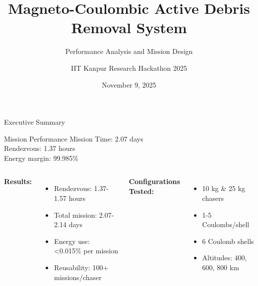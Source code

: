 \documentclass[aspectratio=169]{beamer}
\title{Magneto-Coulombic Active Debris Removal System}
\subtitle{Performance Analysis and Mission Design}
\author{IIT Kanpur Research Hackathon 2025}
\date{November 9, 2025}
\institute{Indian Institute of Technology Kanpur}
\begin{document}
\begin{frame}
\titlepage
\end{frame}

\begin{frame}{Executive Summary}
\begin{block}{Mission Performance}
\centering
\Large
Mission Time: 2.07 days\\
Rendezvous: 1.37 hours\\
Energy margin: 99.985\%
\end{block}

\vspace{0.5cm}

\begin{columns}[t]
\textbf{Results:}
\begin{itemize}
    \item Rendezvous: 1.37-1.57 hours
    \item Total mission: 2.07-2.14 days
    \item Energy use: <0.015\% per mission
    \item Reusability: 100+ missions/chaser
\end{itemize}

\textbf{Configurations Tested:}
\begin{itemize}
    \item 10 kg \& 25 kg chasers
    \item 1-5 Coulombs/shell
    \item 6 Coulomb shells
    \item Altitudes: 400, 600, 800 km
\end{itemize}
\end{columns}
\end{frame}
\end{document}
